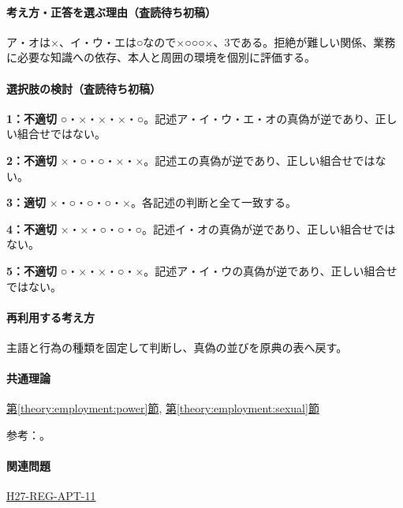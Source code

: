 \paragraph{考え方・正答を選ぶ理由（査読待ち初稿）} ア・オは×、イ・ウ・エは○なので×○○○×、3である。拒絶が難しい関係、業務に必要な知識への依存、本人と周囲の環境を個別に評価する。

\paragraph{選択肢の検討（査読待ち初稿）}\mbox{}\par

\noindent\textbf{1：不適切} ○・×・×・×・○。記述ア・イ・ウ・エ・オの真偽が逆であり、正しい組合せではない。\par

\noindent\textbf{2：不適切} ×・○・○・×・×。記述エの真偽が逆であり、正しい組合せではない。\par

\noindent\textbf{3：適切} ×・○・○・○・×。各記述の判断と全て一致する。\par

\noindent\textbf{4：不適切} ×・×・○・○・○。記述イ・オの真偽が逆であり、正しい組合せではない。\par

\noindent\textbf{5：不適切} ○・×・×・○・×。記述ア・イ・ウの真偽が逆であり、正しい組合せではない。\par

\paragraph{再利用する考え方} 主語と行為の種類を固定して判断し、真偽の並びを原典の表へ戻す。

\paragraph{共通理論} \hyperref[theory:employment:power]{第\ref*{theory:employment:power}節}, \hyperref[theory:employment:sexual]{第\ref*{theory:employment:sexual}節}

\par 参考：\cite{employment_power2012,employment_power_current,employment_sexual_current,employment_sexual2018}。

\paragraph{関連問題} \hyperref[q:h27-reg-apt-11]{H27-REG-APT-11}

